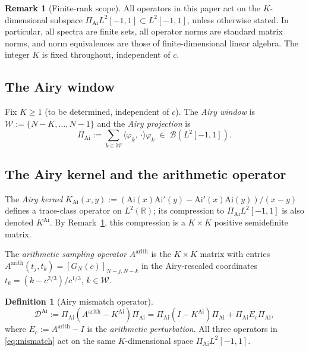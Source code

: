 \documentclass[12pt,a4paper]{amsart}
\theoremstyle{definition}
\newtheorem{definition}[theorem]{Definition}
\newtheorem{remark}[theorem]{Remark}
\newcommand{\KAi}{K^{\mathrm{Ai}}}
\newcommand{\DAi}{\mathcal{D}^{\mathrm{Ai}}}
\newcommand{\PAi}{\Pi_{\mathrm{Ai}}}
\newcommand{\GN}{G_N(c)}
\newcommand{\Ec}{E_c}
\newcommand{\ip}[2]{\langle #1,\, #2 \rangle}
\begin{document}
\begin{remark}[Finite-rank scope]\label{rem:finiterank}
All operators in this paper act on the $K$-dimensional subspace
$\PAi L^2[-1,1] \subset L^2[-1,1]$, unless otherwise stated.
In particular, all spectra are finite sets, all operator norms are
standard matrix norms, and norm equivalences are those of
finite-dimensional linear algebra.
The integer $K$ is fixed throughout, independent of $c$.
\end{remark}

\subsection{The Airy window}

Fix $K \ge 1$ (to be determined, independent of $c$).
The \emph{Airy window} is $\mathcal{W} := \{N-K,\ldots,N-1\}$ and the
\emph{Airy projection} is
\begin{equation}\label{eq:Pai}
  \PAi := \sum_{k \in \mathcal{W}} \ip{\varphi_k}{\cdot}\varphi_k
  \;\in\; \mathcal{B}(L^2[-1,1]).
\end{equation}

\subsection{The Airy kernel and the arithmetic operator}

The \emph{Airy kernel}
$K_{\mathrm{Ai}}(x,y) := (\mathrm{Ai}(x)\mathrm{Ai}'(y) - \mathrm{Ai}'(x)\mathrm{Ai}(y))/(x-y)$
defines a trace-class operator on $L^2(\mathbb{R})$;
its compression to $\PAi L^2[-1,1]$ is also denoted $\KAi$.
By Remark~\ref{rem:finiterank}, this compression is a $K\times K$
positive semidefinite matrix.

The \emph{arithmetic sampling operator} $A^{\mathrm{arith}}$ is the
$K\times K$ matrix with entries
$A^{\mathrm{arith}}(t_j,t_k) = [\GN]_{N-j,N-k}$
in the Airy-rescaled coordinates $t_k = (k - c^{2/3})/c^{1/3}$,
$k \in \mathcal{W}$.

\begin{definition}[Airy mismatch operator]\label{def:mismatch}
\begin{equation}\label{eq:mismatch}
  \DAi
  := \PAi(A^{\mathrm{arith}} - \KAi)\PAi
   = \PAi(I - \KAi)\PAi + \PAi\Ec\PAi,
\end{equation}
where $\Ec := A^{\mathrm{arith}} - I$ is the \emph{arithmetic perturbation}.
All three operators in \eqref{eq:mismatch} act on the same
$K$-dimensional space $\PAi L^2[-1,1]$.
\end{definition}
\end{document}
